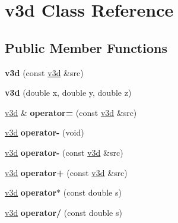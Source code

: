 \hypertarget{classv3d}{\section{v3d Class Reference}
\label{classv3d}
}
\subsection*{Public Member Functions}
\begin{DoxyCompactItemize}
\item 
\hypertarget{classv3d_a5152412a52980248ca630b74c5e9da60}{{\bfseries v3d} (const \hyperlink{classv3d}{v3d} \&src)}\label{classv3d_a5152412a52980248ca630b74c5e9da60}

\item 
\hypertarget{classv3d_a17d11a40bc6ba924cb661a0e3626e175}{{\bfseries v3d} (double x, double y, double z)}\label{classv3d_a17d11a40bc6ba924cb661a0e3626e175}

\item 
\hypertarget{classv3d_a369fdfd247a1dc65afc41cd80cb7fd22}{\hyperlink{classv3d}{v3d} \& {\bfseries operator=} (const \hyperlink{classv3d}{v3d} \&src)}\label{classv3d_a369fdfd247a1dc65afc41cd80cb7fd22}

\item 
\hypertarget{classv3d_a4c60c33d83177111e363ee08aed7917c}{\hyperlink{classv3d}{v3d} {\bfseries operator-\/} (void)}\label{classv3d_a4c60c33d83177111e363ee08aed7917c}

\item 
\hypertarget{classv3d_a52b56cffee2ae2e5155a4245ff350f61}{\hyperlink{classv3d}{v3d} {\bfseries operator-\/} (const \hyperlink{classv3d}{v3d} \&src)}\label{classv3d_a52b56cffee2ae2e5155a4245ff350f61}

\item 
\hypertarget{classv3d_a7b5e9398b618765b5cd4ab2ab8e5b509}{\hyperlink{classv3d}{v3d} {\bfseries operator+} (const \hyperlink{classv3d}{v3d} \&src)}\label{classv3d_a7b5e9398b618765b5cd4ab2ab8e5b509}

\item 
\hypertarget{classv3d_a1c581ef7635ee9b0c5c8270a65890a13}{\hyperlink{classv3d}{v3d} {\bfseries operator$\ast$} (const double s)}\label{classv3d_a1c581ef7635ee9b0c5c8270a65890a13}

\item 
\hypertarget{classv3d_afe999a2652e912162bcd835c6aed286f}{\hyperlink{classv3d}{v3d} {\bfseries operator/} (const double s)}\label{classv3d_afe999a2652e912162bcd835c6aed286f}


\end{DoxyCompactItemize}
